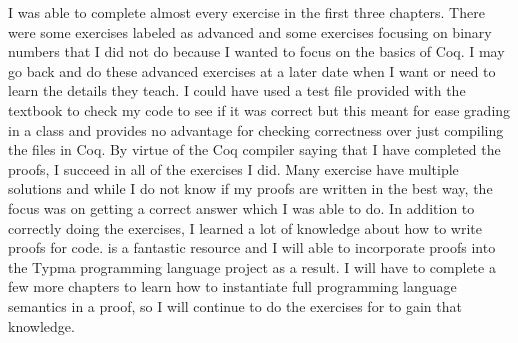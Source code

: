 \documentclass[10pt,twocolumn]{article}
\begin{document}
I was able to complete almost every exercise in the first three chapters. There were some exercises labeled as advanced and some exercises focusing on binary numbers that I did not do because I wanted to focus on the basics of Coq. I may go back and do these advanced exercises at a later date when I want or need to learn the details they teach. I could have used a test file provided with the textbook to check my code to see if it was correct but this meant for ease grading in a class and provides no advantage for checking correctness over just compiling the files in Coq. By virtue of the Coq compiler saying that I have completed the proofs, I succeed in all of the exercises I did. Many exercise have multiple solutions and while I do not know if my proofs are written in the best way, the focus was on getting a correct answer which I was able to do. In addition to correctly doing the exercises, I learned a lot of knowledge about how to write proofs for code. \textcite{Pierce2021Software} is a fantastic resource and I will able to incorporate proofs into the Typma programming language project as a result. I will have to complete a few more chapters to learn how to instantiate full programming language semantics in a proof, so I will continue to do the exercises for \textcite{Pierce2021Software} to gain that knowledge.

\printbibliography 
\end{document}
